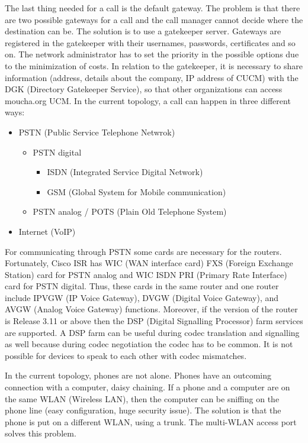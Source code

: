 \documentclass{article}
\begin{document}
The last thing needed for a call is the default gateway. The problem is that there are two possible gateways for a call and the call manager cannot decide where the destination can be. The solution is to use a gatekeeper server. Gateways are registered in the gatekeeper with their usernames, passwords, certificates and so on. The network administrator has to set the priority in the possible options due to the minimization of costs. In relation to the gatekeeper, it is necessary to share information (address, details about the company, IP address of CUCM) with the DGK (Directory Gatekeeper Service), so that other organizations can access moucha.org UCM. In the current topology, a call can happen in three different ways:
    \begin{itemize}
    \item PSTN (Public Service Telephone Netwrok)
        \begin{itemize}
        \item PSTN digital
            \begin{itemize}
                    \item ISDN (Integrated Service Digital Network)
                    \item GSM (Global System for Mobile communication)
            \end{itemize}
        \item PSTN analog / POTS (Plain Old Telephone System)
        \end{itemize} 
    \item Internet (VoIP)
\end{itemize}

For communicating through PSTN some cards are necessary for the routers. Fortunately, Cisco ISR has WIC (WAN interface card) FXS (Foreign Exchange Station) card for PSTN analog and WIC ISDN PRI (Primary Rate Interface) card for PSTN digital\cite{CARDS}. Thus, these cards in the same router and one router include IPVGW (IP Voice Gateway), DVGW (Digital Voice Gateway), and AVGW (Analog Voice Gateway) functions. Moreover, if the version of the router is Release 3.11 or above then the  DSP (Digital Signalling Processor) farm services are supported. A DSP farm can be useful during codec translation and signalling as well because during codec negotiation the codec has to be common. It is not possible for devices to speak to each other with codec mismatches.

In the current topology, phones are not alone. Phones have an outcoming connection with a computer, daisy chaining. If a phone and a computer are on the same WLAN (Wireless LAN), then the computer can be sniffing on the phone line (easy configuration, huge security issue). The solution is that the phone is put on a different WLAN, using a trunk. The multi-WLAN access port solves this problem. 
\end{document}
